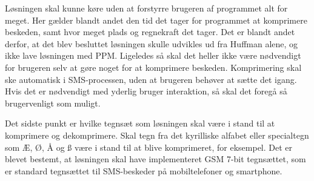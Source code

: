 Løsningen skal kunne køre uden at forstyrre brugeren af programmet alt for meget. Her gælder blandt andet den tid det tager for programmet at komprimere beskeden, samt hvor meget plads og regnekraft det tager. Det er blandt andet derfor, at det blev besluttet løsningen skulle udvikles ud fra Huffman alene, og ikke lave løsningen med PPM. Ligeledes så skal det heller ikke være nødvendigt for brugeren selv at gøre noget for at komprimere beskeden. Komprimering skal ske automatisk i SMS-processen, uden at brugeren behøver at sætte det igang. Hvis det er nødvendigt med yderlig bruger interaktion, så skal det foregå så brugervenligt som muligt.

Det sidste punkt er hvilke tegnsæt som løsningen skal være i stand til at komprimere og dekomprimere. Skal tegn fra det kyrilliske alfabet eller specialtegn som Æ, Ø, Å og ß være i stand til at blive komprimeret, for eksempel. Det er blevet bestemt, at løsningen skal have implementeret GSM 7-bit tegnsættet, som er standard tegnsættet til SMS-beskeder på mobiltelefoner og smartphone.